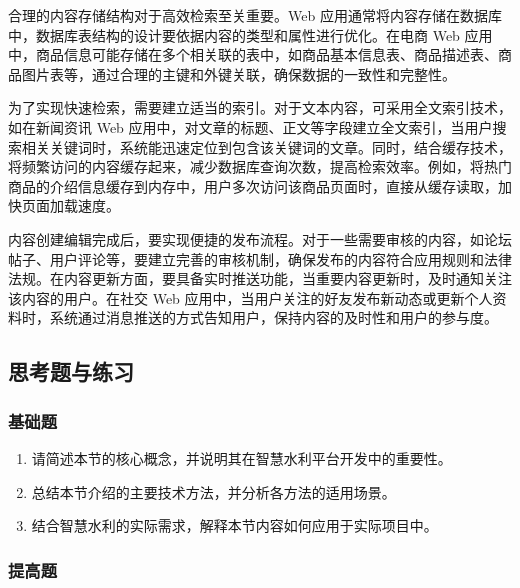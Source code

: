 
合理的内容存储结构对于高效检索至关重要。Web 应用通常将内容存储在数据库中，数据库表结构的设计要依据内容的类型和属性进行优化。在电商 Web 应用中，商品信息可能存储在多个相关联的表中，如商品基本信息表、商品描述表、商品图片表等，通过合理的主键和外键关联，确保数据的一致性和完整性。

为了实现快速检索，需要建立适当的索引。对于文本内容，可采用全文索引技术，如在新闻资讯 Web 应用中，对文章的标题、正文等字段建立全文索引，当用户搜索相关关键词时，系统能迅速定位到包含该关键词的文章。同时，结合缓存技术，将频繁访问的内容缓存起来，减少数据库查询次数，提高检索效率。例如，将热门商品的介绍信息缓存到内存中，用户多次访问该商品页面时，直接从缓存读取，加快页面加载速度。


内容创建编辑完成后，要实现便捷的发布流程。对于一些需要审核的内容，如论坛帖子、用户评论等，要建立完善的审核机制，确保发布的内容符合应用规则和法律法规。在内容更新方面，要具备实时推送功能，当重要内容更新时，及时通知关注该内容的用户。在社交 Web 应用中，当用户关注的好友发布新动态或更新个人资料时，系统通过消息推送的方式告知用户，保持内容的及时性和用户的参与度。

\hypertarget{ux601dux8003ux9898ux4e0eux7ec3ux4e60-2}{%
\subsection{思考题与练习}\label{ux601dux8003ux9898ux4e0eux7ec3ux4e60-2}}

\hypertarget{ux57faux7840ux9898-2}{%
\subsubsection{基础题}\label{ux57faux7840ux9898-2}}

\begin{enumerate}
\def\labelenumi{\arabic{enumi}.}
\tightlist
\item
  请简述本节的核心概念，并说明其在智慧水利平台开发中的重要性。
\item
  总结本节介绍的主要技术方法，并分析各方法的适用场景。
\item
  结合智慧水利的实际需求，解释本节内容如何应用于实际项目中。
\end{enumerate}

\hypertarget{ux63d0ux9ad8ux9898-2}{%
\subsubsection{提高题}\label{ux63d0ux9ad8ux9898-2}}


